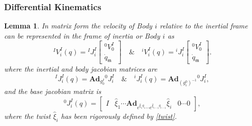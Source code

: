 \documentclass[lettersize,journal]{IEEEtran}
\def \Ad {\textbf{Ad}}
\newtheorem{lemma}[theorem]{Lemma}
\begin{document}
\subsubsection{Differential Kinematics} \label{diffkin}
\begin{lemma}
In matrix form the velocity of Body $i$ relative to the inertial frame can be represented in the frame of inertia or Body $i$ as
\begin{equation}
{}^IV_i^I(q)= {}^IJ^I_i\begin{bmatrix}^0V^I_0\\\dot{q}_\mathfrak{m}\end{bmatrix} \quad \& \quad ^iV_i^I(q)={}^iJ^I_i\begin{bmatrix}^0V^I_0\\\dot{q}_\mathfrak{m}\end{bmatrix}. \label{bodyvelocity}
\end{equation}
where the inertial and body jacobian matrices are
\begin{equation}
    ^IJ^I_i(q)=\Ad_{g^I_0} {}^0J^I_i \quad \& \quad {}^iJ^I_i(q)=\Ad_{(g^0_i)^{-1}}{}{}^0J^I_i,
    \label{bodyjacobian}
\end{equation}
and the base jacobian matrix is
\begin{equation}
    ^0J^I_i(q)=\begin{bmatrix} I  & \hat{\xi}_{1}\cdots \Ad_{e^{\hat{\xi}_{1}q_{1}}\cdots e^{\hat{\xi}_{i-1}q_{i-1}}}\hat{\xi}_i & 0\cdots 0\end{bmatrix},
    \label{basejacobian}
\end{equation}
where the twist $\hat{\xi}_i$ has been rigorously defined by \eqref{twist}.
\end{lemma}
\end{document}

